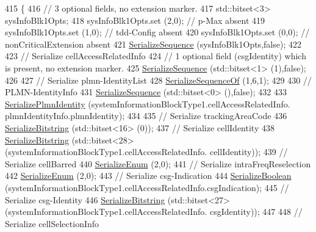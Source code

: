 \begin{DoxyCode}
415 \{
416   \textcolor{comment}{// 3 optional fields, no extension marker.}
417   std::bitset<3> sysInfoBlk1Opts;
418   sysInfoBlk1Opts.set (2,0); \textcolor{comment}{// p-Max absent}
419   sysInfoBlk1Opts.set (1,0); \textcolor{comment}{// tdd-Config absent}
420   sysInfoBlk1Opts.set (0,0); \textcolor{comment}{// nonCriticalExtension absent}
421   \hyperlink{classns3_1_1Asn1Header_aa9744858380443ed95836fed08799aed}{SerializeSequence} (sysInfoBlk1Opts,\textcolor{keyword}{false});
422 
423   \textcolor{comment}{// Serialize cellAccessRelatedInfo}
424   \textcolor{comment}{// 1 optional field (csgIdentity) which is present, no extension marker.}
425   \hyperlink{classns3_1_1Asn1Header_aa9744858380443ed95836fed08799aed}{SerializeSequence} (std::bitset<1> (1),\textcolor{keyword}{false});
426 
427   \textcolor{comment}{// Serialize plmn-IdentityList}
428   \hyperlink{classns3_1_1Asn1Header_a066b6dd077bde6b0c243f3eda2621277}{SerializeSequenceOf} (1,6,1);
429 
430   \textcolor{comment}{// PLMN-IdentityInfo }
431   \hyperlink{classns3_1_1Asn1Header_aa9744858380443ed95836fed08799aed}{SerializeSequence} (std::bitset<0> (),\textcolor{keyword}{false});
432 
433   \hyperlink{classns3_1_1RrcAsn1Header_a2824dcd323f61aa425479066d5982e29}{SerializePlmnIdentity} (systemInformationBlockType1.cellAccessRelatedInfo.
      plmnIdentityInfo.plmnIdentity);
434 
435   \textcolor{comment}{// Serialize trackingAreaCode}
436   \hyperlink{classns3_1_1Asn1Header_a0be8d507b87be07f85f35b906f8e5da7}{SerializeBitstring} (std::bitset<16> (0));
437   \textcolor{comment}{// Serialize cellIdentity}
438   \hyperlink{classns3_1_1Asn1Header_a0be8d507b87be07f85f35b906f8e5da7}{SerializeBitstring} (std::bitset<28> (systemInformationBlockType1.cellAccessRelatedInfo.
      cellIdentity));
439   \textcolor{comment}{// Serialize cellBarred}
440   \hyperlink{classns3_1_1Asn1Header_ac8e56956823ab8e4470c09e162e7bf24}{SerializeEnum} (2,0);
441   \textcolor{comment}{// Serialize intraFreqReselection}
442   \hyperlink{classns3_1_1Asn1Header_ac8e56956823ab8e4470c09e162e7bf24}{SerializeEnum} (2,0);
443   \textcolor{comment}{// Serialize csg-Indication}
444   \hyperlink{classns3_1_1Asn1Header_a28e3626acdffec71c0376f4f3e7e7ec4}{SerializeBoolean} (systemInformationBlockType1.cellAccessRelatedInfo.csgIndication);
445   \textcolor{comment}{// Serialize csg-Identity}
446   \hyperlink{classns3_1_1Asn1Header_a0be8d507b87be07f85f35b906f8e5da7}{SerializeBitstring} (std::bitset<27> (systemInformationBlockType1.cellAccessRelatedInfo.
      csgIdentity));
447 
448   \textcolor{comment}{// Serialize cellSelectionInfo}

\end{DoxyCode}
